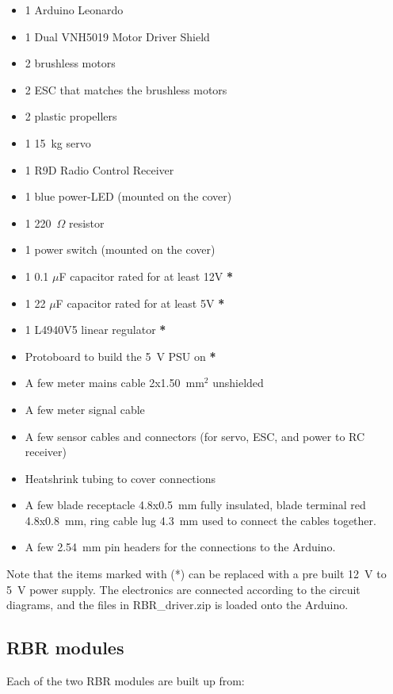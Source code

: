 \begin{itemize}
  \item 1 Arduino Leonardo
  \item 1 Dual VNH5019 Motor Driver Shield
  \item 2 brushless motors
  \item 2 ESC that matches the brushless motors
  \item 2 plastic propellers
  \item 1 15~kg servo
  \item 1 R9D Radio Control Receiver
  \item 1 blue power-LED (mounted on the cover)
  \item 1 220~$\Omega$ resistor
  \item 1 power switch (mounted on the cover)
  \item 1 0.1 $\mu$F capacitor rated for at least 12V \textbf{*}
  \item 1 22 $\mu$F capacitor rated for at least 5V \textbf{*}
  \item 1 L4940V5 linear regulator \textbf{*}
  \item Protoboard to build the 5~V PSU on \textbf{*}
  \item A few meter mains cable 2x1.50~mm$^2$ unshielded
  \item A few meter signal cable
  \item A few sensor cables and connectors (for servo, ESC, and power to RC
    receiver)
  \item Heatshrink tubing to cover connections
  \item A few blade receptacle 4.8x0.5~mm fully insulated, blade terminal red
    4.8x0.8~mm, ring cable lug 4.3~mm used to connect the cables together.
  \item A few 2.54~mm pin headers for the connections to the Arduino.
\end{itemize}

Note that the items marked with (*) can be replaced with a pre built 12~V to
5~V power supply.  The electronics are connected according to the circuit
diagrams, and the files in RBR\_driver.zip is loaded onto the Arduino.

\subsection{RBR modules}

Each of the two RBR modules are built up from:

